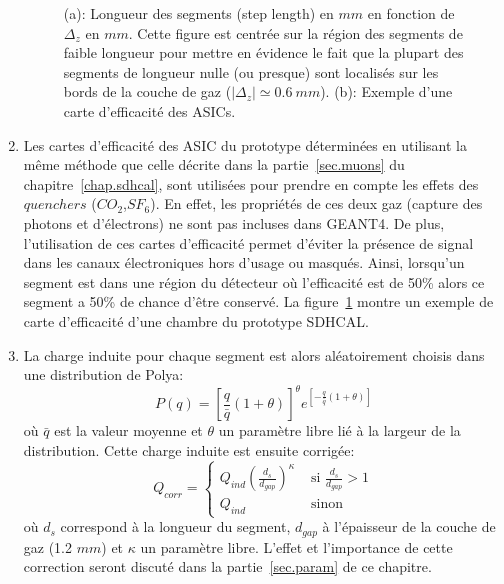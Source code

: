 \begin{enumerate}[~~1-]
\begin{figure}[!ht]
    \caption{(a): Longueur des segments (step length) en $mm$ en fonction de $\Delta_z$ en $mm$. Cette figure est centrée sur la région des segments de faible longueur pour mettre en évidence le fait que la plupart des segments de longueur nulle (ou presque) sont localisés sur les bords de la couche de gaz ($|\Delta_z|\simeq0.6\ mm$). (b): Exemple d'une carte d'efficacité des ASICs.}
    \label{fig.map_and_length_vs_deltaz}
  \end{figure}
\item Les cartes d'efficacité des ASIC du prototype déterminées en utilisant la même méthode que celle décrite dans la partie~\ref{sec.muons} du chapitre~\ref{chap.sdhcal}, sont utilisées pour prendre en compte les effets des $quenchers$ ($CO_2$,$SF_6$). En effet, les propriétés de ces deux gaz (capture des photons et d'électrons) ne sont pas incluses dans GEANT4. De plus, l'utilisation de ces cartes d’efficacité permet d'éviter la présence de signal dans les canaux électroniques hors d'usage ou masqués. Ainsi, lorsqu'un segment est dans une région du détecteur où l'efficacité est de 50\% alors ce segment a 50\% de chance d'être conservé. La figure~\ref{fig.map_and_length_vs_deltaz} montre un exemple de carte d'efficacité d'une chambre du prototype SDHCAL.
\item La charge induite pour chaque segment est alors aléatoirement choisis dans une distribution de Polya: 
  \begin{equation}
    \label{eq.polya}
    P(q)=[\frac{q}{\bar q}(1+\theta)]^{\theta}e^{[-\frac{q}{\bar q}(1+\theta)]}
  \end{equation}
  où $\bar q$ est la valeur moyenne et $\theta$ un paramètre libre lié à la largeur de la distribution. Cette charge induite est ensuite corrigée: 
  \begin{equation}
    \label{eq.lengthcorrection}
    Q_{corr} = \left\{ \begin{array}{rl}
      Q_{ind}(\frac{d_s}{d_{gap}})^\kappa &\mbox{ si $\frac{d_s}{d_{gap}}>1$} \\
      Q_{ind} &\mbox{ sinon}
    \end{array} \right.
  \end{equation}
  où $d_s$ correspond à la longueur du segment, $d_{gap}$ à l'épaisseur de la couche de gaz (1.2 $mm$) et $\kappa$ un paramètre libre. L'effet et l'importance de cette correction seront discuté dans la partie~\ref{sec.param} de ce chapitre.

\end{enumerate}
